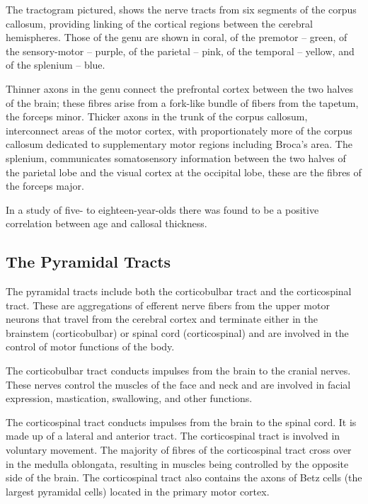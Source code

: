 The tractogram pictured, shows the nerve tracts from six segments of the corpus callosum, providing linking of the cortical regions between the cerebral hemispheres. Those of the genu are shown in coral, of the premotor -- green, of the sensory-motor -- purple, of the parietal -- pink, of the temporal -- yellow, and of the splenium -- blue.

Thinner axons in the genu connect the prefrontal cortex between the two halves of the brain; these fibres arise from a fork-like bundle of fibers from the tapetum, the forceps minor. Thicker axons in the trunk of the corpus callosum, interconnect areas of the motor cortex, with proportionately more of the corpus callosum dedicated to supplementary motor regions including Broca's area. The splenium, communicates somatosensory information between the two halves of the parietal lobe and the visual cortex at the occipital lobe, these are the fibres of the forceps major.

In a study of five- to eighteen-year-olds there was found to be a positive correlation between age and callosal thickness.

\hypertarget{the-pyramidal-tracts}{%
\subsection{The Pyramidal Tracts}\label{the-pyramidal-tracts}}

The pyramidal tracts include both the corticobulbar tract and the corticospinal tract. These are aggregations of efferent nerve fibers from the upper motor neurons that travel from the cerebral cortex and terminate either in the brainstem (corticobulbar) or spinal cord (corticospinal) and are involved in the control of motor functions of the body.

The corticobulbar tract conducts impulses from the brain to the cranial nerves. These nerves control the muscles of the face and neck and are involved in facial expression, mastication, swallowing, and other functions.

The corticospinal tract conducts impulses from the brain to the spinal cord. It is made up of a lateral and anterior tract. The corticospinal tract is involved in voluntary movement. The majority of fibres of the corticospinal tract cross over in the medulla oblongata, resulting in muscles being controlled by the opposite side of the brain. The corticospinal tract also contains the axons of Betz cells (the largest pyramidal cells) located in the primary motor cortex.

